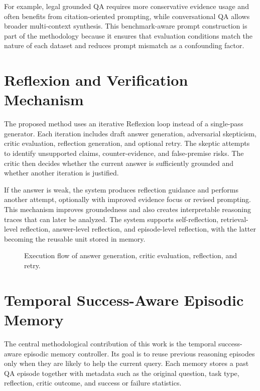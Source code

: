 For example, legal grounded QA requires more conservative evidence usage and often benefits from citation-oriented prompting, while conversational QA allows broader multi-context synthesis. This benchmark-aware prompt construction is part of the methodology because it ensures that evaluation conditions match the nature of each dataset and reduces prompt mismatch as a confounding factor.


\section{Reflexion and Verification Mechanism}
\label{sec:reflexion-and-verification}

The proposed method uses an iterative Reflexion loop instead of a single-pass generator. Each iteration includes draft answer generation, adversarial skepticism, critic evaluation, reflection generation, and optional retry. The skeptic attempts to identify unsupported claims, counter-evidence, and false-premise risks. The critic then decides whether the current answer is sufficiently grounded and whether another iteration is justified.

If the answer is weak, the system produces reflection guidance and performs another attempt, optionally with improved evidence focus or revised prompting. This mechanism improves groundedness and also creates interpretable reasoning traces that can later be analyzed. The system supports self-reflection, retrieval-level reflection, answer-level reflection, and episode-level reflection, with the latter becoming the reusable unit stored in memory.

\begin{figure}[H]
    \centering
    
    \caption{Execution flow of answer generation, critic evaluation, reflection, and retry.}
    \label{fig:process-flow}
\end{figure}

\section{Temporal Success-Aware Episodic Memory}
\label{sec:temporal-success-aware-memory}

The central methodological contribution of this work is the temporal success-aware episodic memory controller. Its goal is to reuse previous reasoning episodes only when they are likely to help the current query. Each memory stores a past QA episode together with metadata such as the original question, task type, reflection, critic outcome, and success or failure statistics.

